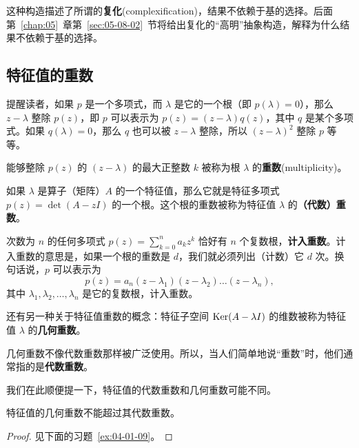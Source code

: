 这种构造描述了所谓的\textbf{复化}(complexification)，结果不依赖于基的选择。后面第~\ref{chap:05}~章第~\ref{sec:05-08-02}~节将给出复化的“高明”抽象构造，解释为什么结果不依赖于基的选择。

\subsection{特征值的重数}\label{sec:04-01-05}

提醒读者，如果 $p$ 是一个多项式，而 $\lambda$ 是它的一个根（即 $p(\lambda) = 0$），那么 $z - \lambda$ 整除 $p(z)$，即 $p$ 可以表示为 $p(z) = (z - \lambda)q(z)$，其中 $q$ 是某个多项式。如果 $q(\lambda) = 0$，那么 $q$ 也可以被 $z - \lambda$ 整除，所以 $(z - \lambda)^2$ 整除 $p$ 等等。

能够整除 $p(z)$ 的 $(z - \lambda)$ 的最大正整数 $k$ 被称为根 $\lambda$ 的\textbf{重数}(multiplicity)。

如果 $\lambda$ 是算子（矩阵）$A$ 的一个特征值，那么它就是特征多项式 $p(z) = \det(A - zI)$ 的一个根。这个根的重数被称为特征值 $\lambda$ 的\textbf{（代数）重数}。

次数为 $n$ 的任何多项式 $p(z) = \sum_{k=0}^n a_k z^k$ 恰好有 $n$ 个复数根，\textbf{计入重数}。计入重数的意思是，如果一个根的重数是 $d$，我们就必须列出（计数）它 $d$ 次。换句话说，$p$ 可以表示为
$$p(z) = a_n (z - \lambda_1)(z - \lambda_2)\dots(z - \lambda_n),$$
其中 $\lambda_1, \lambda_2, \dots, \lambda_n$ 是它的复数根，计入重数。

还有另一种关于特征值重数的概念：特征子空间 $\operatorname{Ker}(A - \lambda I)$ 的维数被称为特征值 $\lambda$ 的\textbf{几何重数}。

几何重数不像代数重数那样被广泛使用。所以，当人们简单地说“重数”时，他们通常指的是\textbf{代数重数}。


我们在此顺便提一下，特征值的代数重数和几何重数可能不同。

\begin{proposition}\label{stmt:04-01-01}
特征值的几何重数不能超过其代数重数。
\end{proposition}

\begin{proof}见下面的习题~\ref{ex:04-01-09}。\end{proof}

